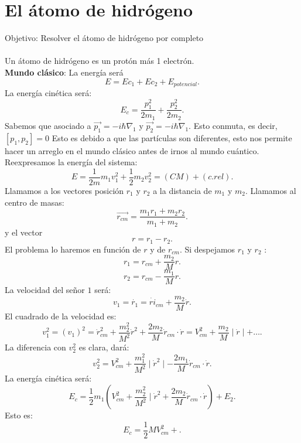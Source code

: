 


\chapter{El átomo de hidrógeno}
\pagestyle{simple} 
\newpage

\pagestyle{main}

Objetivo: Resolver el átomo de hidrógeno por completo\\
\\
Un átomo de hidrógeno es un protón más 1 electrón. \\
\textbf{Mundo clásico}: La energía será 
\[
	E=Ec_1+ Ec_2 + E_{potencial}
.\] 
La energía cinética será:
\[
E_c= \frac{p_1^2}{2m_1}+ \frac{p_2^2}{2m_2}	
.\] 
Sabemos que asociado a $\vec{p_1}= -i \hbar  \nabla_1 $ y $\vec{p_2}= -i\hbar \nabla_1$. Esto conmuta, es decir, $[p_1,p_2]=0$ Esto es debido a que las partículas son diferentes, esto nos permite hacer un arreglo en el mundo clásico antes de irnos al mundo cuántico. Reexpresamos la energía del sistema:
\[
	E=\frac{1}{2m}m_1v_1^2+\frac{1}{2}m_2v_2^2= \left( CM \right) + \left( c.rel \right) 
.\]  
Llamamos a los vectores posición $r_1$ y $r_2$ a la distancia de $m_1$ y $m_2$. Llamamos al centro de masas:
\[
	\vec{r_{cm}}=\frac{m_1r_1+m_2r_2}{m_1+m_2}
.\] 
y el vector 
\[
r=r_1-r_2
.\]
El problema lo haremos en función de $r$ y de $r_{cm}$. Si despejamos $r_1 $ y $r_2$ :
\[
	r_1= r_{cm}+ \frac{m_2}{M}r
.\] 
\[
	r_2=r_{cm} - \frac{m_1}{M}r
.\] 
La velocidad del señor $1$ será:
\[
v_1=\dot{r_1}= \dot{ri}_{cm}+ \frac{m_2}{M}\dot{r}
.\] 
El cuadrado de la velocidad es:
\[
	v_1^2=\left( v_1 \right) ^2=\dot{r}_{cm}^2+ \frac{m_2^2}{M^2} \dot{r}^2+\frac{2m_2}{M}\dot{r}_{cm}\cdot \dot{r}=V_{cm}^2+ \frac{m_2}{M} \mid \dot{r} \mid + \ldots 
.\] 
La diferencia con $v_2^2$ es clara, dará: \[
	v_2^2=V_{cm}^2 + \frac{m_1^2}{M^2}  \mid \dot{r}^2 \mid -\frac{2m_1}{M}\dot r_{cm}\cdot \dot{r}		
.\] 
La energía cinética será:
\[
	E_c= \frac{1}{2}m_1\left( V_{cm}^2+ \frac{m_2^2}{M^2} \mid \dot{r}^2 + \frac{2m_2}{M}\dot{r}_{cm} \cdot \dot{r}  \right) + E_2
.\] 
Esto es:
\[
	E_c= \frac{1}{2}M V_{cm}^2 + 
.\] 

